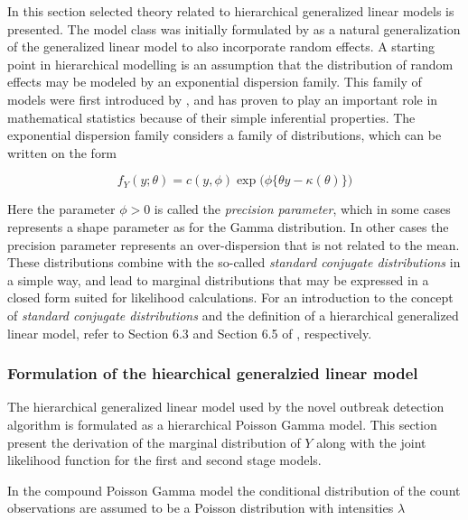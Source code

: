 \documentclass[preprint, 3p, authoryear]{elsarticle} %
\begin{document}
In this section selected theory related to hierarchical generalized linear models is presented. The model class was initially formulated by \citet{Lee_1996} as a natural generalization of the generalized linear model to also incorporate random effects. A starting point in hierarchical modelling is an assumption that the distribution of random effects may be modeled by an exponential dispersion family. This family of models were first introduced by \citet{Fisher_1922}, and has proven to play an important role in mathematical statistics because of their simple inferential properties. The exponential dispersion family considers a family of distributions, which can be written on the form

\begin{equation}\label{eq:expDispFam}
  f_Y(y;\theta)=c(y,\phi)\exp\big(\phi \{\theta y-\kappa(\theta) \}\big)
\end{equation}

Here the parameter \(\phi>0\) is called the \emph{precision parameter}, which in some cases represents a shape parameter as for the Gamma distribution. In other cases the precision parameter represents an over-dispersion that is not related to the mean. These distributions combine with the so-called \emph{standard conjugate distributions} in a simple way, and lead to marginal distributions that may be expressed in a closed form suited for likelihood calculations. For an introduction to the concept of \emph{standard conjugate distributions} and the definition of a hierarchical generalized linear model, refer to Section 6.3 and Section 6.5 of \citet{Madsen_2010}, respectively.

\hypertarget{formulation-of-the-hiearchical-generalzied-linear-model}{%
\subsubsection{Formulation of the hiearchical generalzied linear model}\label{formulation-of-the-hiearchical-generalzied-linear-model}}

The hierarchical generalized linear model used by the novel outbreak detection algorithm is formulated as a hierarchical Poisson Gamma model. This section present the derivation of the marginal distribution of \(Y\) along with the joint likelihood function for the first and second stage models.

In the compound Poisson Gamma model the conditional distribution of the count observations are assumed to be a Poisson distribution with intensities \(\lambda\)
\end{document}
